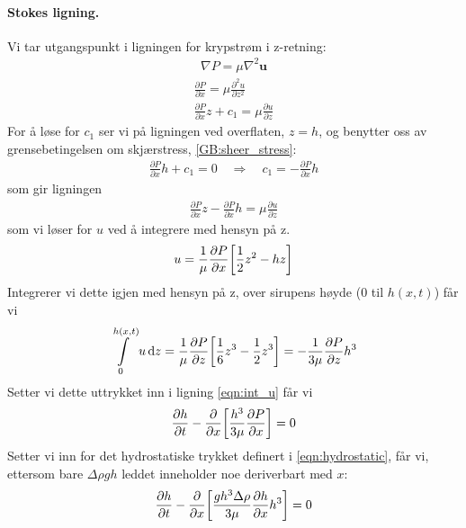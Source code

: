 \documentclass[12p,a4paper]{article}
\renewcommand{\b}{\boldsymbol}
\renewcommand{\d}{\mathrm{d}}
\newcommand{\half}{\frac{1}{2}}
\begin{document}
\paragraph{Stokes ligning.}
Vi tar utgangspunkt i ligningen for krypstrøm i z-retning:
\begin{align*}
    \nabla P = \mu\nabla^2 \b u
\end{align*}
\begin{align*}
    \frac{\partial P}{\partial x} = \mu\frac{\partial^2 u}{\partial z^2} \\
    \frac{\partial P}{\partial x}z + c_1 = \mu\frac{\partial u}{\partial z}
\end{align*}
For å løse for $c_1$ ser vi på ligningen ved overflaten, $z=h$, og benytter oss av grensebetingelsen om skjærstress, \ref{GB:sheer_stress}:
\begin{align*}
    \frac{\partial P}{\partial x}h + c_1 = 0
    \quad \Rightarrow \quad c_1 = -\frac{\partial P}{\partial x}h
\end{align*}
som gir ligningen
\begin{align*}
    \frac{\partial P}{\partial x}z -\frac{\partial P}{\partial x}h = \mu\frac{\partial u}{\partial z}
\end{align*}
som vi løser for $u$ ved å integrere med hensyn på z.
\begin{align*}
    u = \frac{1}{\mu}\frac{\partial P}{\partial x}\qty[\half z^2 - hz]
\end{align*}
Integrerer vi dette igjen med hensyn på z, over sirupens høyde ($0$ til $h(x,t)$) får vi
\begin{align*}
    \int\limits_0^{h(x,t)}u\, \d z = \frac{1}{\mu} \frac{\partial P}{\partial z}\qty[\frac{1}{6}z^3 - \half z^3] = -\frac{1}{3\mu} \frac{\partial P}{\partial z} h^3
\end{align*}
Setter vi dette uttrykket inn i ligning \ref{eqn:int_u} får vi
\begin{align}\label{eqn:hP}
    \frac{\partial h}{\partial t} - \frac{\partial}{\partial x}\qty[\frac{h^3}{3\mu}\frac{\partial P}{\partial x}] = 0
\end{align}
Setter vi inn for det hydrostatiske trykket definert i \ref{eqn:hydrostatic}, får vi, ettersom bare $\Delta\rho g h$ leddet inneholder noe deriverbart med $x$:
\begin{align}\label{eqn:h}
    \frac{\partial h}{\partial t} - \frac{\partial}{\partial x}\qty[\frac{gh^3 \Delta\rho}{3\mu}\frac{\partial h}{\partial x}h^3] = 0
\end{align}
\end{document}
